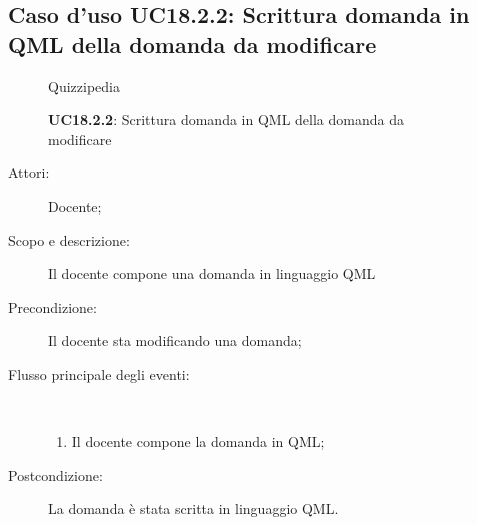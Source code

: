 \subsection{Caso d'uso UC18.2.2: Scrittura domanda in QML della domanda da modificare}
	\begin{figure}[H]
		\centering
		\begin{resizedtikzpicture}{\textwidth}
		\begin{umlsystem}[x=0, fill=lightgray!20]{Quizzipedia}
		\end{umlsystem}
		\end{resizedtikzpicture}
		\caption{\textbf{UC18.2.2}: Scrittura domanda in QML della domanda da modificare}
		\label{UC18.2.2}
	\end{figure}
\begin{description}
\item[Attori:] Docente;
\item[Scopo e descrizione:] Il docente compone una domanda in linguaggio QML
      \item[Precondizione:] Il docente sta modificando una domanda;

        \item[Flusso principale degli eventi:] \ 
 \begin{enumerate}
          \item Il docente compone la domanda in QML;

      \end{enumerate}
    \item[Postcondizione:] La domanda è stata scritta in linguaggio QML.
  \end{description}
\hypertarget{UC18.2.3}{}
